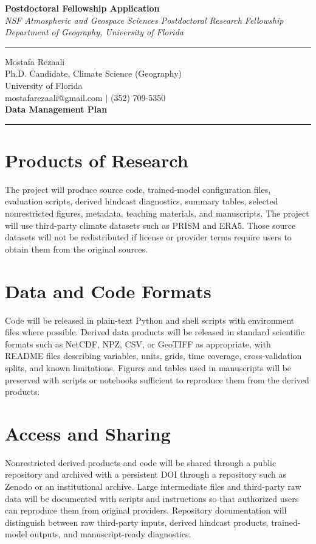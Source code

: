 \documentclass[11pt,letterpaper]{article}
\begin{document}
\begin{center}
    \vspace*{-1.5cm}
    {\Large\bfseries Postdoctoral Fellowship Application} \\[0.2cm]
    {\small\textit{NSF Atmospheric and Geospace Sciences Postdoctoral Research Fellowship}} \\[0.05cm]
    {\small\textit{Department of Geography, University of Florida}} \\[0.1cm]
    \rule{0.6\textwidth}{0.4pt}
\end{center}
\vspace{-0.5cm}

\noindent
Mostafa Rezaali \\
Ph.D. Candidate, Climate Science (Geography) \\
University of Florida \\
mostafarezaali@gmail.com \quad $\mid$ \quad (352) 709-5350 \\[0.3cm]
{\large\bfseries Data Management Plan}\\[-0.15cm]
\rule{\textwidth}{0.4pt}

\section*{Products of Research}
The project will produce source code, trained-model configuration files, evaluation scripts, derived hindcast diagnostics, summary tables, selected nonrestricted figures, metadata, teaching materials, and manuscripts. The project will use third-party climate datasets such as PRISM and ERA5. Those source datasets will not be redistributed if license or provider terms require users to obtain them from the original sources.

\section*{Data and Code Formats}
Code will be released in plain-text Python and shell scripts with environment files where possible. Derived data products will be released in standard scientific formats such as NetCDF, NPZ, CSV, or GeoTIFF as appropriate, with README files describing variables, units, grids, time coverage, cross-validation splits, and known limitations. Figures and tables used in manuscripts will be preserved with scripts or notebooks sufficient to reproduce them from the derived products.

\section*{Access and Sharing}
Nonrestricted derived products and code will be shared through a public repository and archived with a persistent DOI through a repository such as Zenodo or an institutional archive. Large intermediate files and third-party raw data will be documented with scripts and instructions so that authorized users can reproduce them from original providers. Repository documentation will distinguish between raw third-party inputs, derived hindcast products, trained-model outputs, and manuscript-ready diagnostics.
\end{document}
